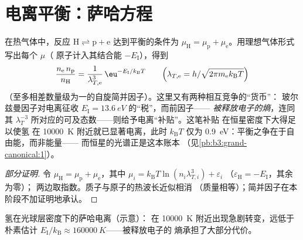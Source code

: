 \section{电离平衡：萨哈方程}

\begin{proposition}[萨哈方程]\label{prop:b3:grand-canonical:saha}
在热气体中，反应 $\text{H} \rightleftharpoons \text{p} +
\text{e}$ 达到平衡的条件为 $\mu_{\text{H}} = \mu_{\text{p}} +
\mu_{\text{e}}$。用理想气体形式写出每个 $\mu$（
原子计入其结合能 $-E_{\text{I}}$），得到
\[
\frac{n_{\text{e}}\,n_{\text{p}}}{n_{\text{H}}}
 = \frac{1}{\lambda_{T,\text{e}}^3}\,
\eu^{-E_{\text{I}}/k_{\text{B}}T}
\qquad\Big(\lambda_{T,\text{e}} =
h/\sqrt{2\pi m_{\text{e}}k_{\text{B}}T}\Big)
\]
（至多相差数量级为一的自旋简并因子）。这里又有两种相互竞争的“货币”：
玻尔兹曼因子对电离征收
$E_{\text{I}} = \qty{13.6}{eV}$ 的“税”，而前因子——
\emph{被释放电子的熵}，连同其 $\lambda_T^{-3}$
所对应的可及态数——则给予电离“补贴”。这笔补贴
在恒星密度下大得足以使氢
在 \qty{10000}{K} 附近就已显著电离，此时 $k_{\text{B}}T$ 仅为
\qty{0.9}{eV}：平衡之争在于自由能，而非能量——
而恒星的光谱正是这本账本
（见\cref{pb:b3:grand-canonical:1}）。
\end{proposition}

\begin{proof}[部分证明]
令 $\mu_{\text{H}} = \mu_{\text{p}} + \mu_{\text{e}}$，其中 $\mu_i
= k_{\text{B}}T\ln(n_i\lambda_{T,i}^3) + \varepsilon_i$
（$\varepsilon_{\text{H}} = -E_{\text{I}}$，其余为零）；
两边取指数。质子与原子的热波长近似相消
（质量相等）；简并因子在本阶段不加证明地承认。
\end{proof}

\begin{omfigure}

{\small 氢在光球层密度下的萨哈电离（示意）：
在 \qty{10000}{K} 附近出现急剧转变，远低于朴素估计
$E_{\text{I}}/k_{\text{B}} \approx \qty{160000}{K}$——被释放电子的
熵承担了大部分代价。}
\end{omfigure}

